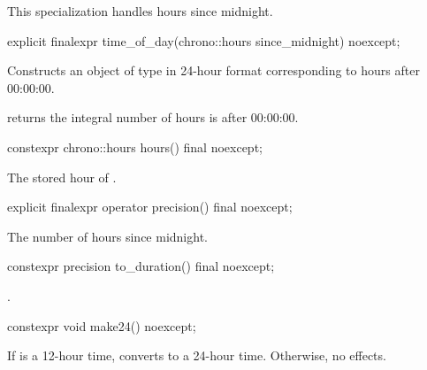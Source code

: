 \pnum
\begin{note}
This specialization handles hours since midnight.
\end{note}

%
\begin{itemdecl}
explicit finalexpr time_of_day(chrono::hours since_midnight) noexcept;
\end{itemdecl}

\begin{itemdescr}
\pnum
\effects
Constructs an object of type  in 24-hour format
corresponding to  hours after 00:00:00.

\pnum
\postconditions
{} returns the integral number of hours  is after 00:00:00.
\end{itemdescr}

%
\begin{itemdecl}
constexpr chrono::hours hours() final noexcept;
\end{itemdecl}

\begin{itemdescr}
\pnum
\returns The stored hour of .
\end{itemdescr}

%
\begin{itemdecl}
explicit finalexpr operator precision() final noexcept;
\end{itemdecl}

\begin{itemdescr}
\pnum
\returns The number of hours since midnight.
\end{itemdescr}

%
\begin{itemdecl}
constexpr precision to_duration() final noexcept;
\end{itemdecl}

\begin{itemdescr}
\pnum
\returns {}.
\end{itemdescr}

%
\begin{itemdecl}
constexpr void make24() noexcept;
\end{itemdecl}

\begin{itemdescr}
\pnum
\effects
If  is a 12-hour time,
converts to a 24-hour time.
Otherwise, no effects.
\end{itemdescr}

